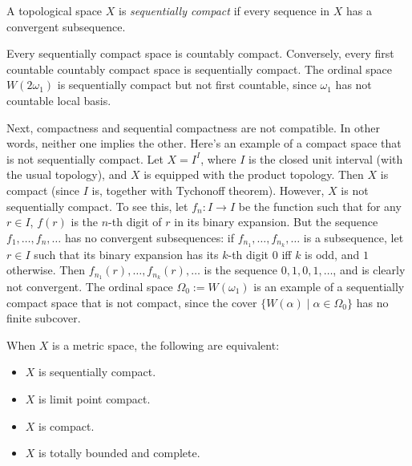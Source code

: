 \documentclass[12pt]{article}
\begin{document}
A topological space $X$ is \emph{sequentially compact} if every sequence in $X$ has a convergent subsequence.

Every sequentially compact space is countably compact.  Conversely, every first countable countably compact space is sequentially compact.  The ordinal space $W(2\omega_1)$ is sequentially compact but not first countable, since $\omega_1$ has not countable local basis.

Next, compactness and sequential compactness are not compatible.  In other words, neither one implies the other.  Here's an example of a compact space that is not sequentially compact.  Let $X=I^I$, where $I$ is the closed unit interval (with the usual topology), and $X$ is equipped with the product topology.  Then $X$ is compact (since $I$ is, together with Tychonoff theorem).  However, $X$ is not sequentially compact.  To see this, let $f_n:I\to I$ be the function such that for any $r\in I$, $f(r)$ is the $n$-th digit of $r$ in its binary expansion.  But the sequence $f_1,\ldots, f_n,\ldots$ has no convergent subsequences: if $f_{n_1},\ldots, f_{n_k},\ldots$ is a subsequence, let $r\in I$ such that its binary expansion has its $k$-th digit $0$ iff $k$ is odd, and $1$ otherwise.  Then $f_{n_1}(r),\ldots, f_{n_k}(r), \ldots$ is the sequence $0,1,0,1,\ldots$, and is clearly not convergent.  The ordinal space $\Omega_0:=W(\omega_1)$ is an example of a sequentially compact space that is not compact, since the cover $\lbrace W(\alpha)\mid \alpha\in \Omega_0\rbrace$ has no finite subcover.

When $X$ is a metric space, the following are equivalent:
\begin{itemize}
\item
$X$ is sequentially compact.
\item
$X$ is limit point compact.
\item
$X$ is compact.
\item
$X$ is totally bounded and complete.
\end{itemize}
\end{document}
